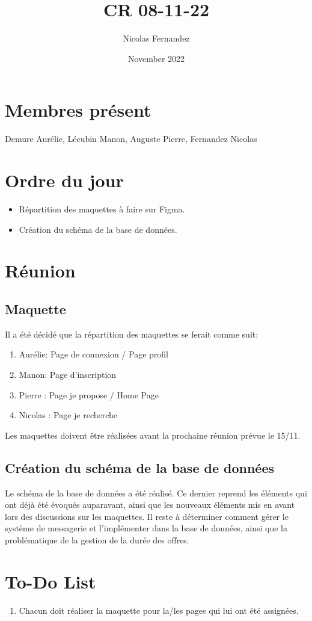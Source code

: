 \documentclass{report}
\title{CR 08-11-22}
\author{Nicolas Fernandez}
\date{November 2022}
\begin{document}
\maketitle

\section{Membres présent}
Demure Aurélie, Lécubin Manon, Auguste Pierre, Fernandez Nicolas

\section{Ordre du jour}

\begin{itemize}
    \item Répartition des maquettes à faire sur Figma.
    \item Création du schéma de la base de données.
\end{itemize}

\section{Réunion}
\subsection{Maquette}

Il a été décidé que la répartition des maquettes se ferait comme suit:
\begin{enumerate}
    \item Aurélie: Page de connexion / Page profil
    \item Manon: Page d'inscription
    \item Pierre : Page je propose / Home Page
    \item Nicolas : Page je recherche
\end{enumerate}

Les maquettes doivent être réalisées avant la prochaine réunion prévue le 15/11.

\subsection{Création du schéma de la base de données}

Le schéma de la base de données a été réalisé. Ce dernier reprend les éléments qui ont déjà été évoqués auparavant, ainsi que les nouveaux éléments mis en avant lors des discussions sur les maquettes. 
Il reste à déterminer comment gérer le système de messagerie et l'implémenter dans la base de données, ainsi que la problématique de la gestion de la durée des offres.

\section{To-Do List}

\begin{enumerate}
    \item Chacun doit réaliser la maquette pour la/les pages qui lui ont été assignées.
\end{enumerate}
\end{document}
